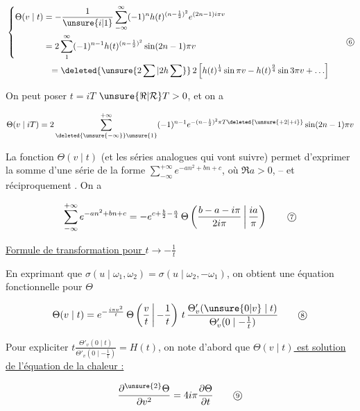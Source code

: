 \[
\begin{aligned}
&\left\{\begin{aligned}
\Theta(v\mid t)&=-\frac1{\unsure{i|1}}\sum_{-\infty}^{\infty}(-1)^n h(t)^{(n-\frac12)^2}e^{(2n-1)i\pi v}\\
&=2\sum_1^\infty(-1)^{n-1}h(t)^{(n-\frac12)^2}\sin(2n-1)\pi v
\end{aligned}\right.\\
&\hspace{5em}=\deleted{\unsure{2\sum|2h\sum}}\,2\left[h(t)^{\frac14}\sin\pi v-h(t)^{\frac94}\sin3\pi v+\ldots\right]
\end{aligned}
\tag*{\textcircled{\scriptsize 6}}
\]

On peut poser $t=iT$  $\unsure{\Re|\mathcal R}T>0$, et on a

\[
\Theta(v\mid iT)=2\sum_{\deleted{\unsure{-\infty}}\unsure{1}}^{+\infty}(-1)^{n-1}e^{-(n-\frac12)^2\pi T\deleted{\unsure{+2|+i}}}\sin(2n-1)\pi v
\]

La fonction $\Theta(v\mid t)$ (et les séries analogues qui vont suivre) permet d'exprimer la somme d'une série de la forme $\sum_{-\infty}^{+\infty}e^{-an^2+bn+c}$, où $\Re a>0$, -- et réciproquement . On a

\[
\sum_{-\infty}^{+\infty}e^{-an^2+bn+c}=-e^{c+\frac b2-\frac a4}\,\Theta\left(\frac{b-a-i\pi}{2i\pi}\,\middle|\,\frac{ia}{\pi}\right)
\tag*{\textcircled{\scriptsize 7}}
\]

\uline{Formule de transformation pour $t\to-\frac1t$}

En exprimant que $\sigma(u\mid\omega_1,\omega_2)=\sigma(u\mid\omega_2,-\omega_1)$, on obtient une équation fonctionnelle pour $\Theta$

\[
\Theta(v\mid t)=e^{-\frac{i\pi v^2}{t}}\,\Theta\left(\frac vt\,\middle|\,-\frac1t\right)\,t\,
\frac{\Theta'_v(\unsure{0|v}\mid t)}{\Theta'_v(0\mid-\frac1t)}
\tag*{\textcircled{\scriptsize 8}}
\]

Pour expliciter $t\frac{\Theta'_v(0\mid t)}{\Theta'_v(0\mid-\frac1t)}=H(t)$, on note d'abord que \uline{$\Theta(v\mid t)$ est solution de l'équation de la chaleur :}

\[
\frac{\partial^{\unsure{2}}\Theta}{\partial v^2}=4i\pi\frac{\partial\Theta}{\partial t}
\tag*{\textcircled{\scriptsize 9}}
\]

